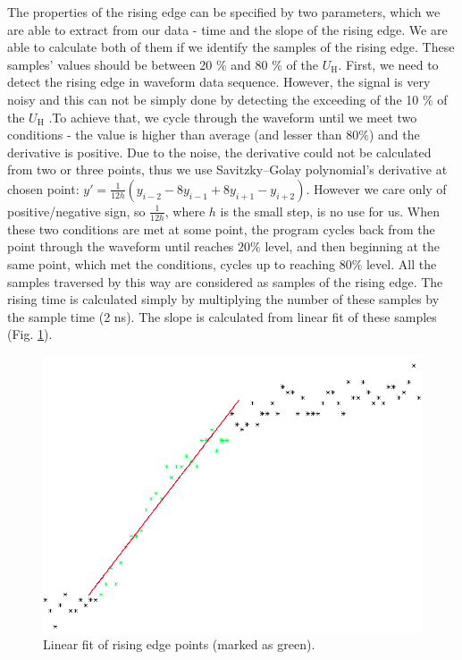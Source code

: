\par
The properties of the rising edge can be specified by two parameters, which we are able to extract from our data - time and the slope of the rising edge. We are able to calculate both of them if we identify the samples of the rising edge. These samples' values should be between 20 $\%$ and 80 $\%$ of the $U_\textrm{H}$. First, we need to detect the rising edge in waveform data sequence. However, the signal is very noisy and this can not be simply done by detecting the exceeding of the 10 $\%$ of the $U_\textrm{H}$ .To achieve that, we cycle through the waveform until we meet two conditions - the value is higher than average (and lesser than $80 \%$) and the derivative is positive. Due to the noise, the derivative could not be calculated from two or three points, thus we use Savitzky–Golay polynomial's derivative at chosen point: $y' = \frac{1}{12h}(y_{i-2} -8y_{i-1} + 8y_{i+1} - y_{i+2}) $. However we care only of positive/negative sign, so $\frac{1}{12h}$, where $h$ is the small step, is no use for us. When these two conditions are met at some point, the program cycles back from the point through the waveform until reaches $20\%$ level, and then beginning at the same point, which met the conditions, cycles up to reaching $80\%$ level. All the samples traversed by this way are considered as samples of the rising edge. The rising time is calculated simply by multiplying the number of these samples by the sample time (2 ns). The slope is calculated from linear fit of these samples (Fig. \ref{linfit}).  


 \begin{figure}[H]
 \centering
 \includegraphics[scale=0.35]{./pictures/linFit}
 \caption{Linear fit of rising edge points (marked as green).}
 \label{linfit}
\end{figure}


